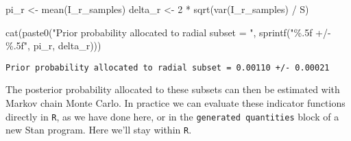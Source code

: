 \documentclass[
  letterpaper,
  DIV=11,
  numbers=noendperiod]{scrartcl}
\newenvironment{Shaded}{\begin{snugshade}}{\end{snugshade}}
\newcommand{\ControlFlowTok}[1]{\textcolor[rgb]{0.00,0.23,0.31}{#1}}
\newcommand{\DecValTok}[1]{\textcolor[rgb]{0.68,0.00,0.00}{#1}}
\newcommand{\FunctionTok}[1]{\textcolor[rgb]{0.28,0.35,0.67}{#1}}
\newcommand{\NormalTok}[1]{\textcolor[rgb]{0.00,0.23,0.31}{#1}}
\newcommand{\OtherTok}[1]{\textcolor[rgb]{0.00,0.23,0.31}{#1}}
\newcommand{\SpecialCharTok}[1]{\textcolor[rgb]{0.37,0.37,0.37}{#1}}
\newcommand{\StringTok}[1]{\textcolor[rgb]{0.13,0.47,0.30}{#1}}
\begin{document}
\begin{Shaded}
\begin{Highlighting}[]
\NormalTok{pi\_r }\OtherTok{\textless{}{-}} \FunctionTok{mean}\NormalTok{(I\_r\_samples)}
\NormalTok{delta\_r }\OtherTok{\textless{}{-}} \DecValTok{2} \SpecialCharTok{*} \FunctionTok{sqrt}\NormalTok{(}\FunctionTok{var}\NormalTok{(I\_r\_samples) }\SpecialCharTok{/}\NormalTok{ S)}

\FunctionTok{cat}\NormalTok{(}\FunctionTok{paste0}\NormalTok{(}\StringTok{"Prior probability allocated to radial subset = "}\NormalTok{,}
           \FunctionTok{sprintf}\NormalTok{(}\StringTok{"\%.5f +/{-} \%.5f"}\NormalTok{, pi\_r, delta\_r)))}
\end{Highlighting}
\end{Shaded}

\begin{verbatim}
Prior probability allocated to radial subset = 0.00110 +/- 0.00021
\end{verbatim}

The posterior probability allocated to these subsets can then be
estimated with Markov chain Monte Carlo. In practice we can evaluate
these indicator functions directly in \texttt{R}, as we have done here,
or in the \texttt{generated\ quantities} block of a new Stan program.
Here we'll stay within \texttt{R}.

\begin{Shaded}
\end{Shaded}
\end{document}
